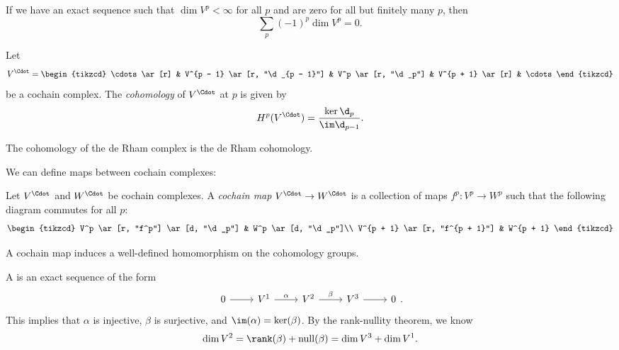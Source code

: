 \documentclass[a4paper]{article}
\begin{document}
\begin{eg}
  If we have an exact sequence such that $\dim V^p < \infty$ for all $p$ and are zero for all but finitely many $p$, then
  \[
    \sum_p (-1)^p \dim V^p = 0.
  \]
\end{eg}

\begin{defi}[Cohomology]
  Let
  \[
    V^{\Cdot} =
    \begin{tikzcd}
      \cdots \ar[r] & V^{p - 1} \ar[r, "\d_{p - 1}"] & V^p \ar[r, "\d_p"] & V^{p + 1} \ar[r] & \cdots
    \end{tikzcd}
  \]
  be a cochain complex. The \emph{cohomology} of $V^{\Cdot}$ at $p$ is given by
  \[
    H^p(V^{\Cdot}) = \frac{\ker \d_p}{\im \d_{p - 1}}.
  \]
\end{defi}

\begin{eg}
  The cohomology of the de Rham complex is the de Rham cohomology.
\end{eg}

We can define maps between cochain complexes:
\begin{defi}
  Let $V^{\Cdot}$ and $W^\Cdot$ be cochain complexes. A \emph{cochain map} $V^{\Cdot} \to W^{\Cdot}$ is a collection of maps $f^p: V^p \to W^p$ such that the following diagram commutes for all $p$:
   \[
     \begin{tikzcd}
       V^p \ar[r, "f^p"] \ar[d, "\d_p"] & W^p \ar[d, "\d_p"]\\
       V^{p + 1} \ar[r, "f^{p + 1}"] & W^{p + 1}
     \end{tikzcd}
   \]
\end{defi}

\begin{prop}
  A cochain map induces a well-defined homomorphism on the cohomology groups.
\end{prop}

\begin{defi}
  A  is an exact sequence of the form
  \[
    \begin{tikzcd}
      0 \ar[r] & V^1 \ar[r, "\alpha"] & V^2 \ar[r, "\beta"] & V^3 \ar[r] & 0
    \end{tikzcd}.
  \]
  This implies that $\alpha$ is injective, $\beta$ is surjective, and $\im (\alpha) = \ker(\beta)$. By the rank-nullity theorem, we know
  \[
    \dim V^2 = \rank(\beta) + \mathrm{null}(\beta) = \dim V^3 + \dim V^1.
  \]
\end{defi}
\end{document}
